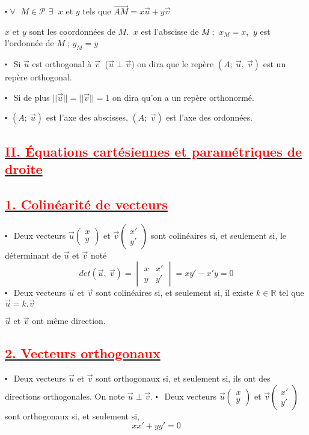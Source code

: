 \documentclass[12pt]{article}
\begin{document}
$\centerdot$ $\forall\;$ $M\in\mathcal{P}$ $\exists\;$ $x$ et $y$ tels que $\overrightarrow{AM}=x\vec{u}+y\vec{v}$

$x$ et $y$ sont les coordonnées de $M$. $\ x$ est l'abscisse de $M\;$; $\ x_{M}=x$, $\ y$ est l'ordonnée de $M\;$; $y_{M}=y$

$\centerdot\ \ $ Si $\vec{u}$ est orthogonal à $\vec{v}\ $ ($\vec{u}\perp\vec{v}$) on dira que le repère $(A;\ \vec{u},\ \vec{v})$ est un repère orthogonal.

$\centerdot\ \ $ Si de plus $||\vec{u}||=||\vec{v}||=1$ on dira qu'on a un repère orthonormé.

$\centerdot\ \ (A;\ \vec{u})$ est l'axe des abscisses, $(A;\ \vec{v})$ est l'axe des ordonnées.
\subsection*{\underline{\textcolor{red}{\textbf{II. Équations cartésiennes et paramétriques de droite}}}}
\subsection*{\underline{\textcolor{red}{\textbf{1. Colinéarité de vecteurs}}}}
$\centerdot\ \ $ Deux vecteurs $\vec{u}\begin{pmatrix}
x\\
y
\end{pmatrix}$ et $\vec{v}\begin{pmatrix}
x'\\
y'
\end{pmatrix}$ sont colinéaires si, et seulement si, le déterminant de $\vec{u}$ et $\vec{v}$ noté $$det(\vec{u},\ \vec{v})=\begin{vmatrix}
x & x'\\
	y & y'
	\end{vmatrix}=xy'-x'y=0$$
	$\centerdot\ \ $ Deux vecteurs $\vec{u}$ et $\vec{v}$ sont colinéaires si, et seulement si, il existe $k\in\mathbb{R}$ tel que $\vec{u}=k.\vec{v}$
	
$\vec{u}$ et $\vec{v}$ ont même direction.
\subsection*{\underline{\textcolor{red}{\textbf{2. Vecteurs orthogonaux}}}}
	$\centerdot\ \ $ Deux vecteurs $\vec{u}$ et $\vec{v}$ sont orthogonaux si, et seulement si, ils ont des directions orthogonales. On note $\vec{u}\perp\vec{v}$.
	$\centerdot\ \ $ Deux vecteurs $\vec{u}\begin{pmatrix}
	x\\
	y
	\end{pmatrix}$ et $\vec{v}\begin{pmatrix}
	x'\\
	y'
	\end{pmatrix}$ sont orthogonaux si, et seulement si, $$xx'+yy'=0$$
\end{document}
